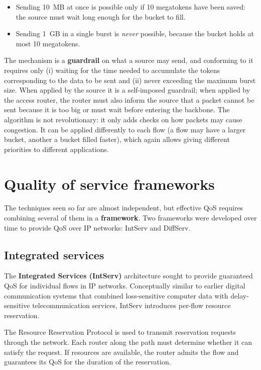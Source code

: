\documentclass[11pt,a4paper,openany]{report}
\begin{document}
\begin{itemize}
	\item Sending 10~MB at once is possible only if 10 megatokens have been saved: the source must wait long enough for the bucket to fill.
	\item Sending 1~GB in a single burst is \emph{never} possible, because the bucket holds at most 10 megatokens.
\end{itemize}

The mechanism is a \textbf{guardrail} on what a source may send, and conforming to it requires only (i) waiting for the time needed to accumulate the tokens corresponding to the data to be sent and (ii) never exceeding the maximum burst size. When applied by the source it is a self-imposed guardrail; when applied by the access router, the router must also inform the source that a packet cannot be sent because it is too big or must wait before entering the backbone. The algorithm is not revolutionary: it only adds checks on how packets may cause congestion. It can be applied differently to each flow (a flow may have a larger bucket, another a bucket filled faster), which again allows giving different priorities to different applications.

\section{Quality of service frameworks}

The techniques seen so far are almost independent, but effective QoS requires combining several of them in a \textbf{framework}. Two frameworks were developed over time to provide QoS over IP networks: IntServ and DiffServ.

\subsection{Integrated services}

The \textbf{Integrated Services (IntServ)} architecture sought to provide guaranteed QoS for individual flows in IP networks. Conceptually similar to earlier digital communication systems that combined loss-sensitive computer data with delay-sensitive telecommunication services, IntServ introduces per-flow resource reservation.

The Resource Reservation Protocol is used to transmit reservation requests through the network. Each router along the path must determine whether it can satisfy the request. If resources are available, the router admits the flow and guarantees its QoS for the duration of the reservation.
\end{document}
